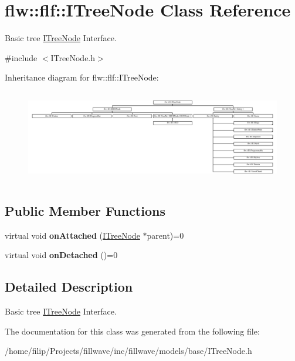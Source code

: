 \hypertarget{classflw_1_1flf_1_1ITreeNode}{}\section{flw\+:\+:flf\+:\+:I\+Tree\+Node Class Reference}
\label{classflw_1_1flf_1_1ITreeNode}


Basic tree \hyperlink{classflw_1_1flf_1_1ITreeNode}{I\+Tree\+Node} Interface.  




{\ttfamily \#include $<$I\+Tree\+Node.\+h$>$}

Inheritance diagram for flw\+:\+:flf\+:\+:I\+Tree\+Node\+:\begin{figure}[H]
\begin{center}
\leavevmode
\includegraphics[height=4.074074cm]{classflw_1_1flf_1_1ITreeNode}
\end{center}
\end{figure}
\subsection*{Public Member Functions}
\begin{DoxyCompactItemize}
\item 
virtual void {\bfseries on\+Attached} (\hyperlink{classflw_1_1flf_1_1ITreeNode}{I\+Tree\+Node} $\ast$parent)=0\hypertarget{classflw_1_1flf_1_1ITreeNode_a983181e4935b547e38b7234410324f90}{}\label{classflw_1_1flf_1_1ITreeNode_a983181e4935b547e38b7234410324f90}

\item 
virtual void {\bfseries on\+Detached} ()=0\hypertarget{classflw_1_1flf_1_1ITreeNode_a2452e98a3718088c87993ac30735f190}{}\label{classflw_1_1flf_1_1ITreeNode_a2452e98a3718088c87993ac30735f190}

\end{DoxyCompactItemize}


\subsection{Detailed Description}
Basic tree \hyperlink{classflw_1_1flf_1_1ITreeNode}{I\+Tree\+Node} Interface. 

The documentation for this class was generated from the following file\+:\begin{DoxyCompactItemize}
\item 
/home/filip/\+Projects/fillwave/inc/fillwave/models/base/I\+Tree\+Node.\+h\end{DoxyCompactItemize}
